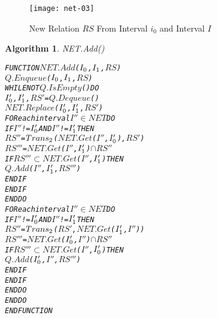 \documentclass[11pt]{report}
\newenvironment{vverbatim}
{
  \begin{alltt}
}
{
    \vspace{-\baselineskip}
  \end{alltt}
}
\newtheorem{vvalgorithm}{Algorithm}[chapter]
\newenvironment{valgorithm}[2]
{
  \begin{vvalgorithm}{#1}
    \label{#2}
    \small
    \begin{vverbatim}
}
{
    \end{vverbatim}
  \end{vvalgorithm}
}
\begin{document}
          \begin{figure}[tbhp]
            \begin{center}
              \texttt{[image: net-03]}
              \caption{New Relation $RS$ From Interval $i_0$ and Interval $I$}
              \label{figu-tempo-ntwk3}
            \end{center}
          \end{figure}

          \begin{valgorithm}{NET.Add()}{algo-tempo-ntadd}
FUNCTION \(NET.Add\)(\(I\sb{0}\), \(I\sb{1}\), \(RS\))
  \(Q.Enqueue\)(\(I\sb{0}\), \(I\sb{1}\), \(RS\))
  WHILE NOT \(Q.IsEmpty\)() DO
    \(I\sb{0}'\), \(I\sb{1}'\), \(RS'\) = \(Q.Dequeue\)()
    \(NET.Replace\)(\(I\sb{0}'\), \(I\sb{1}'\), \(RS'\))
    FOR each interval \(I''\) \(\in\) \(NET\) DO
      IF \(I''\) != \(I\sb{0}'\) AND \(I''\) != \(I\sb{1}'\) THEN
        \(RS''\) =  \(Trans\sb{2}\)(\(NET.Get\)(\(I''\), \(I\sb{0}'\)), \(RS'\))
        \(RS'''\) = \(NET.Get\)(\(I''\), \(I\sb{1}'\)) \(\cap\) \(RS''\)
        IF \(RS'''\) \(\subset\) \(NET.Get\)(\(I''\), \(I\sb{1}'\)) THEN
          \(Q.Add\)(\(I''\), \(I\sb{1}'\), \(RS'''\))
        ENDIF
      ENDIF
    ENDDO
    FOR each interval \(I''\) \(\in\) \(NET\) DO
      IF \(I''\) != \(I\sb{0}'\) AND \(I''\) != \(I\sb{1}'\) THEN
        \(RS''\) =  \(Trans\sb{2}\)(\(RS'\), \(NET.Get\)(\(I\sb{1}'\), \(I''\)))
        \(RS'''\) = \(NET.Get\)(\(I\sb{0}'\), \(I''\)) \(\cap\) \(RS''\)
        IF \(RS'''\) \(\subset\) \(NET.Get\)(\(I''\), \(I\sb{0}'\)) THEN
          \(Q.Add\)(\(I\sb{0}'\), \(I''\), \(RS'''\))
        ENDIF
      ENDIF
    ENDDO
  ENDDO
ENDFUNCTION
          \end{valgorithm}
\end{document}
